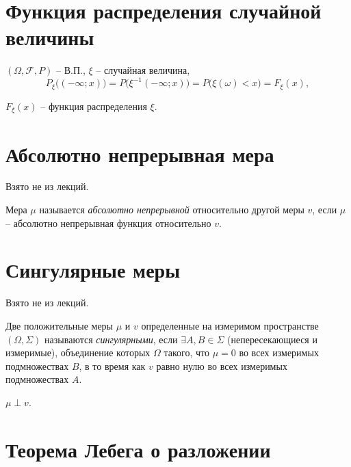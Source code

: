 \newpage

\section{Функция распределения случайной величины}

\begin{definition}
	$(\Omega, \mathcal{F},P )$ -- В.П., $\xi $ -- случайная величина,
	\[
		P_{\xi } \big((-\infty ; x)\big) = P \big(\xi^{-1} (-\infty ; x)\big) = P \big(\xi (\omega ) < x\big) = F_{\xi } (x),
	\]

	$F_{\xi } (x)$ -- функция распределения $\xi $.
\end{definition}

\section{Абсолютно непрерывная мера}

\begin{note}
	Взято не из лекций.
\end{note}

\begin{definition}
	Мера $\mu $ называется \emph{абсолютно непрерывной} относительно другой меры $v$, если $\mu $ -- абсолютно непрерывная функция относительно $v$.
\end{definition}

\section{Сингулярные меры}

\begin{note}
	Взято не из лекций.
\end{note}

\begin{definition}
	Две положительные меры $\mu $ и $v$ определенные на измеримом пространстве $(\Omega , \Sigma )$ называются \emph{сингулярными}, если $\exists A,B \in \Sigma $ (непересекающиеся и измеримые), объединение которых $\Omega $ такого, что $\mu =0$ во всех измеримых подмножествах $B$, в то время как $v$ равно нулю во всех измеримых подмножествах $A$.
	\begin{notation}
		$\mu \perp v$.
	\end{notation}
\end{definition}

\section{Теорема Лебега о разложении}

